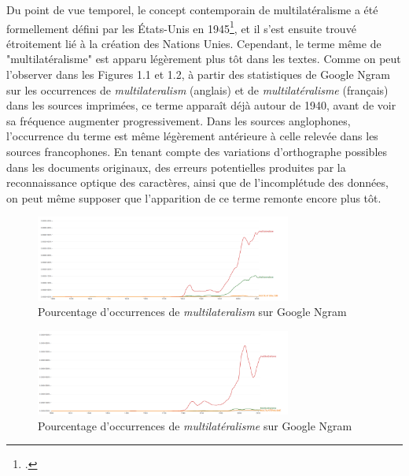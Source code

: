 \documentclass[a4paper,twoside,12pt]{book}
\begin{document}
Du point de vue temporel, le concept contemporain de multilatéralisme a été formellement défini par les États-Unis en 1945\footcite{kahler1992}, et il s'est ensuite trouvé étroitement lié à la création des Nations Unies. Cependant, le terme même de "multilatéralisme" est apparu légèrement plus tôt dans les textes. Comme on peut l'observer dans les Figures 1.1 et 1.2, à partir des statistiques de Google Ngram sur les occurrences de \textit{multilateralism} (anglais) et de \textit{multilatéralisme} (français) dans les sources imprimées, ce terme apparaît déjà autour de 1940, avant de voir sa fréquence augmenter progressivement. Dans les sources anglophones, l'occurrence du terme est même légèrement antérieure à celle relevée dans les sources francophones. En tenant compte des variations d'orthographe possibles dans les documents originaux, des erreurs potentielles produites par la reconnaissance optique des caractères, ainsi que de l'incomplétude des données, on peut même supposer que l'apparition de ce terme remonte encore plus tôt.


\begin{figure}
\centering %
\includegraphics[width=0.75\textwidth]{img/googlengram_english.png}
\caption{Pourcentage d'occurrences de \textit{multilateralism} sur Google Ngram }
\end{figure}


\begin{figure}
\centering %
\includegraphics[width=0.75\textwidth]{img/googlengram_french.png}
\caption{Pourcentage d'occurrences de \textit{multilatéralisme} sur Google Ngram}
\end{figure}
\end{document}
